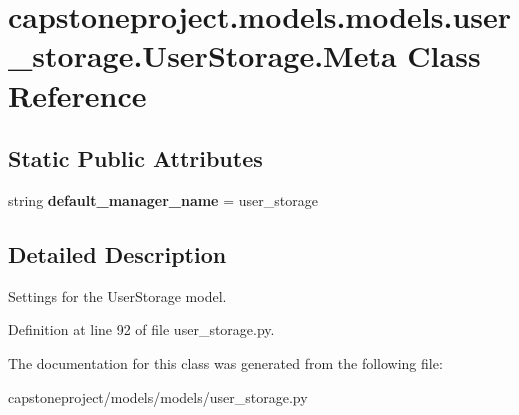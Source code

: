 \hypertarget{classcapstoneproject_1_1models_1_1models_1_1user__storage_1_1_user_storage_1_1_meta}{}\section{capstoneproject.\+models.\+models.\+user\+\_\+storage.\+User\+Storage.\+Meta Class Reference}
\label{classcapstoneproject_1_1models_1_1models_1_1user__storage_1_1_user_storage_1_1_meta}
\subsection*{Static Public Attributes}
\begin{DoxyCompactItemize}
\item 
\mbox{\label{classcapstoneproject_1_1models_1_1models_1_1user__storage_1_1_user_storage_1_1_meta_a33c1fea9578bd7953905605c6c9fd28c}} 
string {\bfseries default\+\_\+manager\+\_\+name} = \textquotesingle{}user\+\_\+storage\textquotesingle{}
\end{DoxyCompactItemize}


\subsection{Detailed Description}
\begin{DoxyVerb}Settings for the UserStorage model.\end{DoxyVerb}
 

Definition at line 92 of file user\+\_\+storage.\+py.



The documentation for this class was generated from the following file\+:\begin{DoxyCompactItemize}
\item 
capstoneproject/models/models/user\+\_\+storage.\+py\end{DoxyCompactItemize}
